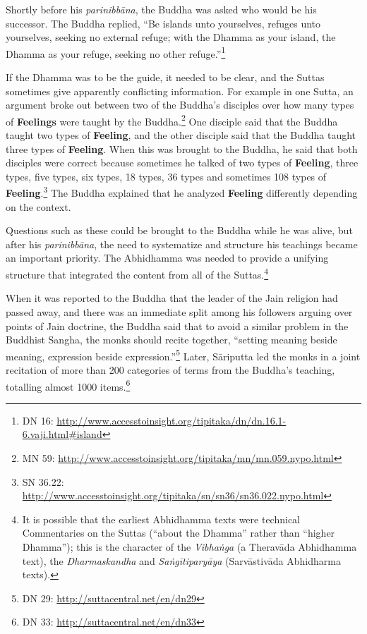 Shortly before his \textit{parinibbāna}, the Buddha was asked who would be his successor. The Buddha replied, “Be islands unto yourselves, refuges unto yourselves, seeking no external refuge; with the Dhamma as your island, the Dhamma as your refuge, seeking no other refuge.”\footnote{DN 16: \url{http://www.accesstoinsight.org/tipitaka/dn/dn.16.1-6.vaji.html\#island}}

If the Dhamma was to be the guide, it needed to be clear, and the Suttas sometimes give apparently conflicting information. For example in one Sutta, an argument broke out between two of the Buddha’s disciples over how many types of \textbf{Feelings} were taught by the Buddha.\footnote{MN 59: \url{http://www.accesstoinsight.org/tipitaka/mn/mn.059.nypo.html}} One disciple said that the Buddha taught two types of \textbf{Feeling}, and the other disciple said that the Buddha taught three types of \textbf{Feeling}. When this was brought to the Buddha, he said that both disciples were correct because sometimes he talked of two types of \textbf{Feeling}, three types, five types, six types, 18 types, 36 types and sometimes 108 types of \textbf{Feeling}.\footnote{SN 36.22: \url{http://www.accesstoinsight.org/tipitaka/sn/sn36/sn36.022.nypo.html}} The Buddha explained that he analyzed \textbf{Feeling} differently depending on the context.

Questions such as these could be brought to the Buddha while he was alive, but after his \textit{parinibbāna}, the need to systematize and structure his teachings became an important priority. The Abhidhamma was needed to provide a unifying structure that integrated the content from all of the Suttas.\footnote{It is possible that the earliest Abhidhamma texts were technical Commentaries on the Suttas (“about the Dhamma” rather than “higher Dhamma”); this is the character of the \textit{Vibhaṅga} (a Theravāda Abhidhamma text), the \textit{Dharmaskandha} and \textit{Saṅgītiparyāya} (Sarvāstivāda Abhidharma texts).}

\pagebreak

When it was reported to the Buddha that the leader of the Jain religion had passed away, and there was an immediate split among his followers arguing over points of Jain doctrine, the Buddha said that to avoid a similar problem in the Buddhist Sangha, the monks should recite together, “setting meaning beside meaning, expression beside expression.”\footnote{DN 29: \url{http://suttacentral.net/en/dn29}} Later, Sāriputta led the monks in a joint recitation of more than 200 categories of terms from the Buddha’s teaching, totalling almost 1000 items.\footnote{DN 33: \url{http://suttacentral.net/en/dn33}}

